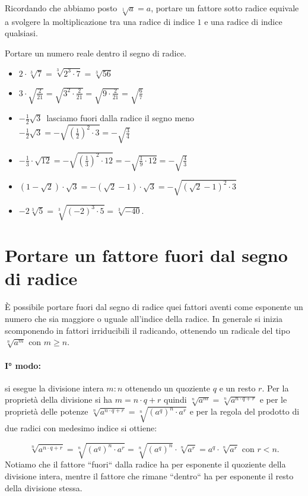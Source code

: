 Ricordando che abbiamo posto $\sqrt[1]a=a$, portare un fattore sotto radice
equivale a svolgere la moltiplicazione tra una radice di indice $1$ e una
radice di indice qualsiasi.
 \begin{esempio}
 Portare un numero reale dentro il segno di radice.
 \begin{itemize}
 \item $2\cdot \sqrt[3]7=\sqrt[3]{2^3\cdot 7}=\sqrt[3]{56}$
 \item $3\cdot \sqrt{\frac 2{21}}=\sqrt{3^2\cdot \frac 2{21}}=
        \sqrt{9\cdot \frac 2{21}}=\sqrt{\frac 6 7}$
 \item $-\frac 1 2\sqrt{3}$\, lasciamo fuori dalla radice il segno meno
       $-\frac 1 2\sqrt{3}=-\sqrt{\left(\frac 1 2\right)^2\cdot 3}=
        -\sqrt{\frac 3 4}$
 \item $-\frac 1 3\cdot \sqrt{12}=-\sqrt{\left(\frac 1 3\right)^2\cdot 12}=
        -\sqrt{\frac 1 9\cdot 12}=-\sqrt{\frac 4 3}$
 \item $(1-\sqrt{2})\cdot \sqrt{3}=-(\sqrt{2}-1)\cdot \sqrt{3}=
        -\sqrt{(\sqrt{2}-1)^2\cdot 3}$
 \item $-2\sqrt[3]5=\sqrt[3]{(-2)^3\cdot 5}=\sqrt[3]{-40}$.
 \end{itemize}
 \end{esempio}

\section{Portare un fattore fuori dal segno di radice}
\label{sec:radicali_portare_fuori}

È possibile portare fuori dal segno di radice quei fattori aventi come
esponente un numero che sia maggiore o uguale all'indice della radice.
In generale si inizia scomponendo in fattori irriducibili il radicando,
ottenendo un radicale del tipo $\sqrt[n]{a^m}$ con $m\ge n$.

\paragraph{I° modo:} si esegue la divisione intera $m:n$ ottenendo un
quoziente $q$ e un resto $r$. Per la proprietà della divisione si
ha $m=n\cdot q+r$ quindi $\sqrt[n]{a^m}=\sqrt[n]{a^{n\cdot q+r}}$
e per le proprietà delle potenze
$\sqrt[n]{a^{n\cdot q+r}}=\sqrt[n]{(a^q)^n\cdot a^r}$
e per la regola del prodotto di due radici con medesimo indice si ottiene:

\[\sqrt[n]{a^{n\cdot q+r}}= \sqrt[n]{(a^q)^n\cdot a^r}=
  \sqrt[n]{(a^q)^n}\cdot \sqrt[n]{a^r}=
  a^q\cdot \sqrt[n]{a^r}\text{ con } r<n.\]
Notiamo che il fattore ``fuori`` dalla radice ha per esponente il quoziente
della divisione intera, mentre il fattore che rimane ``dentro`` ha per
esponente il resto della divisione stessa.

